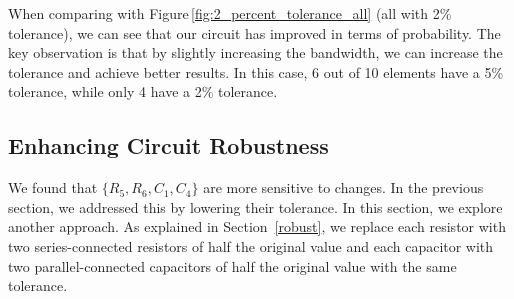 \documentclass[hidelinks,12pt]{article}
\begin{document}
	
	
	When comparing with Figure\,\textcolor{Cyan}{\ref{fig:2_percent_tolerance_all}} (all with 2\% tolerance), we can see that our circuit has improved in terms of probability. The key observation is that by slightly increasing the bandwidth, we can increase the tolerance and achieve better results. In this case, 6 out of 10 elements have a 5\% tolerance, while only 4 have a 2\% tolerance.
	
	\pagebreak
	
	
	\subsection{Enhancing Circuit Robustness}
	We found that \(\{R_5, R_6, C_1, C_4\}\) are more sensitive to changes. In the previous section, we addressed this by lowering their tolerance. In this section, we explore another approach. As explained in Section~\textcolor{Cyan}{\ref{robust}}, we replace each resistor with two series-connected resistors of half the original value and each capacitor with two parallel-connected capacitors of half the original value with the same tolerance.
	
\end{document}
